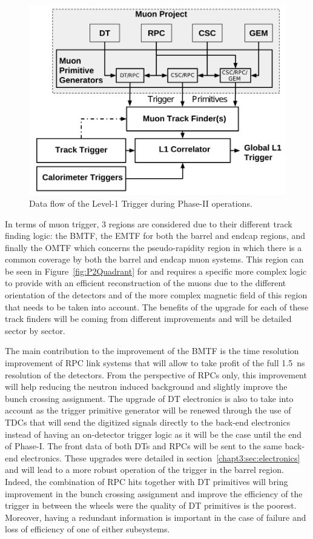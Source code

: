 	\begin{figure}[H]
		\centering
		\includegraphics[width=\plotwidth]{fig/chapt3/Phase-II-L1-Trigger.png}
		\caption{\label{fig:L1-trigger} Data flow of the Level-1 Trigger during Phase-II operations.}
	\end{figure}
	
	In terms of muon trigger, 3 regions are considered due to their different track finding logic: the \acf{BMTF}, the \acf{EMTF} for both the barrel and endcap regions, and finally the \acf{OMTF} which concerns the pseudo-rapidity region in which there is a common coverage by both the barrel and endcap muon systems. This region can be seen in Figure~\ref{fig:P2Quadrant} for  and requires a specific more complex logic to provide with an efficient reconstruction of the muons due to the different orientation of the detectors and of the more complex magnetic field of this region that needs to be taken into account. The benefits of the upgrade for each of these track finders will be coming from different improvements and will be detailed sector by sector.
	
	The main contribution to the improvement of the BMTF is the time resolution improvement of RPC link systems that will allow to take profit of the full \SI{1.5}{ns} resolution of the detectors. From the perspective of RPCs only, this improvement will help reducing the neutron induced background and slightly improve the bunch crossing assignment. The upgrade of DT electronics is also to take into account as the trigger primitive generator will be renewed through the use of TDCs that will send the digitized signals directly to the back-end electronics instead of having an on-detector trigger logic as it will be the case until the end of Phase-I. The front data of both DTs and RPCs will be sent to the same back-end electronics. These upgrades were detailed in section~\ref{chapt3:sec:electronics} and will lead to a more robust operation of the trigger in the barrel region. Indeed, the combination of RPC hits together with DT primitives will bring improvement in the bunch crossing assignment and improve the efficiency of the trigger in between the wheels were the quality of DT primitives is the poorest. Moreover, having a redundant information is important in the case of failure and loss of efficiency of one of either subsystems.
	
